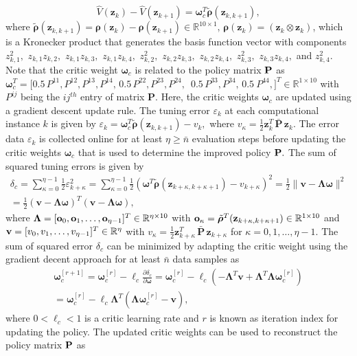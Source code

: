 \documentclass[conference]{IEEEtran}
\begin{document}
 $$\hat{V}(\mathbf{z}_k)-\hat{V}(\mathbf{z}_{k+1})=\boldsymbol{\omega}_c^T\tilde{\bm{\rho}}(\mathbf{z}_{k,k+1}),$$
 where $\tilde{\bm{\rho}}(\mathbf{z}_{k,k+1})=\bm{\rho}(\mathbf{z}_k)-\bm{\rho}(\mathbf{z}_{k+1}) \in \mathbb{R}^{10 \times 1}, \, \bm{\rho}(\mathbf{z}_k)=\left(\mathbf{z}_k\otimes\mathbf{z}_k\right)$, which is a Kronecker product that generates the basis function vector with components $z_{k,1}^2,$ $z_{k,1}z_{k,2},$ $z_{k,1}z_{k,3},$ $z_{k,1}z_{k,4},$ $z_{k,2}^2,$ $z_{k,2}z_{k,3},$ $z_{k,2}z_{k,4},$ $z_{k,3}^2,$ $z_{k,3}z_{k,4},$ and $z_{k,4}^2.$ Note that the critic weight $\bm{\omega}_c$ is related to the policy matrix ${\bf P}$ as  $\boldsymbol{\omega}_c^T = [0.5 \, P^{11},P^{12},P^{13},P^{14},  \, 0.5 \, P^{22}, P^{23},P^{24},$ $\,0.5 \, P^{33}, P^{34},\,0.5 \ P^{44}, ]^T \in \mathbb{R}^{1\times 10}$ with $P^{ij}$ being the $ij^{th}$ entry of matrix $\mathbf{P}.$ %
 Here, the critic weights $\boldsymbol{\omega}_c$ are updated using a gradient descent update rule. The tuning error $\varepsilon_k$ at each computational instance $k$ is given by $\varepsilon_k =\boldsymbol{\omega}_c^T\tilde{\bm{\rho}}(\mathbf{z}_{k,k+1})-{v}_k,$ where $v_\kappa = \frac{1}{2}\mathbf{z}_{k}^T \, \bar{\mathbf{P}} \, \mathbf{z}_{k}$. The error data $\varepsilon_k$ is collected online for at least  $\eta \ge \bar n$ evaluation steps before updating the critic weights $\boldsymbol{\omega}_c$ that is used to determine the improved policy ${\bf P}.$ The sum of squared tuning errors is given by 
 \begin{multline*}
   \delta_c =\sum_{\kappa=0}^{\eta-1}\frac{1}{2}\varepsilon_{k+\kappa}^2=\sum_{\kappa=0}^{\eta-1}\frac{1}{2}(\boldsymbol{\omega}^T\tilde{\bm{\rho}}(\mathbf{z}_{k+\kappa,k+\kappa+1})-{v}_{k+\kappa})^2 = \frac{1}{2}\| \mathbf{v} - \bm{\Lambda}\bm{\omega}\|^2\\
   =\frac{1}{2}\left(\mathbf{v} - \bm{\Lambda}\bm{\omega}\right)^T \left(\mathbf{v} - \bm{\Lambda}\bm{\omega}\right), 
 \end{multline*}
 where $\bm{\Lambda} = [{\bf o}_0,{\bf o}_1,\ldots,{\bf o}_{\eta-1}]^T \in \mathbb{R}^{\eta\times 10}$ with ${\bf o}_\kappa = \tilde{\bm{\rho}}^T({\bf z}_{k+\kappa, k+\kappa+1}) \in \mathbb{R}^{1\times 10}$ and ${\bf v} =[v_0,v_1,\ldots,v_{\eta-1}]^T \in \mathbb{R}^{\eta}$ with $v_\kappa = \frac{1}{2}\mathbf{z}_{k+\kappa}^T \, \bar{\mathbf{P}} \, \mathbf{z}_{k+\kappa}$ for $\kappa = 0,1,\ldots, \eta-1$. %
 The sum of squared error $\delta_c$ can be minimized by adapting the critic weight using the gradient decent approach for at least $\bar n$ data samples as 
 \begin{multline}
   \bm{\omega}_c^{[r+1]} = \bm{\omega}_c^{[r]} - \ell_c\frac{\partial\delta_c}{\partial \bm{\omega}} = \bm{\omega}_c^{[r]} - \ell_c\left(-\bm{\Lambda}^T\mathbf{v} + \bm{\Lambda}^T \bm{\Lambda}\bm{\omega}_c^{[r]}\right)\\ 
 =\bm{\omega}_c^{[r]} - \ell_c \bm{\Lambda}^T\left(\bm{\Lambda}\bm{\omega}_c^{[r]}-\mathbf{v}\right), 
 \label{eq:criticWeights}
 \end{multline}
 where $0<\ell_c<1$ is a critic learning rate and $r$ is known as iteration index for updating the policy. The updated critic weights can be used to reconstruct the policy matrix ${\bf P}$ as
 
\end{document}
